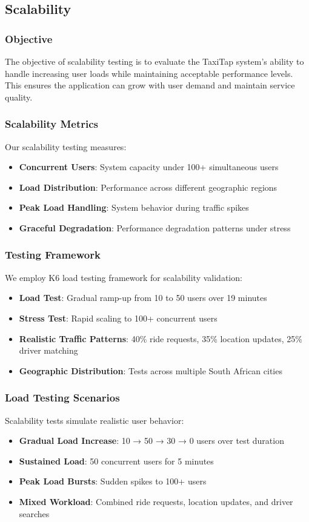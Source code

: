 \documentclass[a4paper,12pt]{article}
\begin{document}
\subsection{Scalability}

\subsubsection{Objective}
The objective of scalability testing is to evaluate the TaxiTap system's ability to handle increasing user loads while maintaining acceptable performance levels. This ensures the application can grow with user demand and maintain service quality.

\subsubsection{Scalability Metrics}
Our scalability testing measures:
\begin{itemize}
    \item \textbf{Concurrent Users}: System capacity under 100+ simultaneous users
    \item \textbf{Load Distribution}: Performance across different geographic regions
    \item \textbf{Peak Load Handling}: System behavior during traffic spikes
    \item \textbf{Graceful Degradation}: Performance degradation patterns under stress
\end{itemize}

\subsubsection{Testing Framework}
We employ K6 load testing framework for scalability validation:
\begin{itemize}
    \item \textbf{Load Test}: Gradual ramp-up from 10 to 50 users over 19 minutes
    \item \textbf{Stress Test}: Rapid scaling to 100+ concurrent users
    \item \textbf{Realistic Traffic Patterns}: 40\% ride requests, 35\% location updates, 25\% driver matching
    \item \textbf{Geographic Distribution}: Tests across multiple South African cities
\end{itemize}


\subsubsection{Load Testing Scenarios}
Scalability tests simulate realistic user behavior:
\begin{itemize}
    \item \textbf{Gradual Load Increase}: 10 → 50 → 30 → 0 users over test duration
    \item \textbf{Sustained Load}: 50 concurrent users for 5 minutes
    \item \textbf{Peak Load Bursts}: Sudden spikes to 100+ users
    \item \textbf{Mixed Workload}: Combined ride requests, location updates, and driver searches
\end{itemize}
\end{document}
